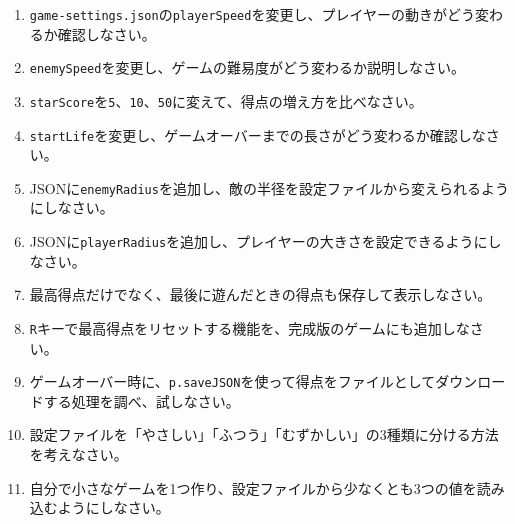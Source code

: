 \begin{enumerate}
    \item \texttt{game-settings.json}の\texttt{playerSpeed}を変更し、プレイヤーの動きがどう変わるか確認しなさい。
    \item \texttt{enemySpeed}を変更し、ゲームの難易度がどう変わるか説明しなさい。
    \item \texttt{starScore}を\texttt{5}、\texttt{10}、\texttt{50}に変えて、得点の増え方を比べなさい。
    \item \texttt{startLife}を変更し、ゲームオーバーまでの長さがどう変わるか確認しなさい。
    \item JSONに\texttt{enemyRadius}を追加し、敵の半径を設定ファイルから変えられるようにしなさい。
    \item JSONに\texttt{playerRadius}を追加し、プレイヤーの大きさを設定できるようにしなさい。
    \item 最高得点だけでなく、最後に遊んだときの得点も保存して表示しなさい。
    \item \texttt{R}キーで最高得点をリセットする機能を、完成版のゲームにも追加しなさい。
    \item ゲームオーバー時に、\texttt{p.saveJSON}を使って得点をファイルとしてダウンロードする処理を調べ、試しなさい。
    \item 設定ファイルを「やさしい」「ふつう」「むずかしい」の3種類に分ける方法を考えなさい。
    \item 自分で小さなゲームを1つ作り、設定ファイルから少なくとも3つの値を読み込むようにしなさい。
\end{enumerate}
